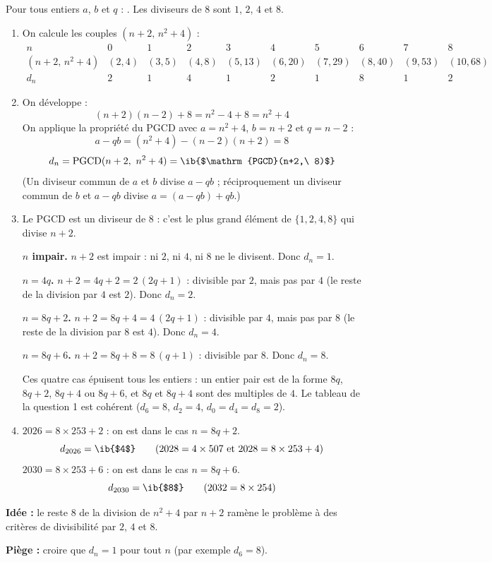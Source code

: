 \begin{prop}[PGCD]
Pour tous entiers $a$, $b$ et $q$ : . Les diviseurs de $8$ sont $1$, $2$, $4$ et $8$.
\end{prop}
\begin{enumerate}
  \item On calcule les couples $(n+2,\,n^2+4)$ :
  \[\begin{array}{c|ccccccccc}
  n&0&1&2&3&4&5&6&7&8\\\hline
  (n+2,\,n^2+4)&(2,4)&(3,5)&(4,8)&(5,13)&(6,20)&(7,29)&(8,40)&(9,53)&(10,68)\\\hline
  d_n&2&1&4&1&2&1&8&1&2
  \end{array}\]

  \item On développe :
  \[(n+2)(n-2)+8=n^2-4+8=n^2+4\]
  On applique la propriété du PGCD avec $a=n^2+4$, $b=n+2$ et $q=n-2$ :
  \[a-qb=(n^2+4)-(n-2)(n+2)=8\]
  \[d_n=\mathrm{PGCD}(n+2,\ n^2+4)=\ib{$\mathrm{PGCD}(n+2,\ 8)$}\]
  (Un diviseur commun de $a$ et $b$ divise $a-qb$ ; réciproquement un diviseur commun de $b$ et $a-qb$ divise $a=(a-qb)+qb$.)

  \item Le PGCD est un diviseur de $8$ : c'est le plus grand élément de $\{1,2,4,8\}$ qui divise $n+2$.

  \textbf{$n$ impair.} $n+2$ est impair : ni $2$, ni $4$, ni $8$ ne le divisent. Donc $d_n=\boxed{1}$.

  \textbf{$n=4q$.} $n+2=4q+2=2\,(2q+1)$ : divisible par $2$, mais pas par $4$ (le reste de la division par $4$ est $2$). Donc $d_n=\boxed{2}$.

  \textbf{$n=8q+2$.} $n+2=8q+4=4\,(2q+1)$ : divisible par $4$, mais pas par $8$ (le reste de la division par $8$ est $4$). Donc $d_n=\boxed{4}$.

  \textbf{$n=8q+6$.} $n+2=8q+8=8\,(q+1)$ : divisible par $8$. Donc $d_n=\boxed{8}$.

  Ces quatre cas épuisent tous les entiers : un entier pair est de la forme $8q$, $8q+2$, $8q+4$ ou $8q+6$, et $8q$ et $8q+4$ sont des multiples de $4$. Le tableau de la question 1 est cohérent ($d_6=8$, $d_2=4$, $d_0=d_4=d_8=2$).

  \item $2026=8\times253+2$ : on est dans le cas $n=8q+2$.
  \[d_{2026}=\ib{$4$}\qquad(2028=4\times507\ \text{et}\ 2028=8\times253+4)\]
  $2030=8\times253+6$ : on est dans le cas $n=8q+6$.
  \[d_{2030}=\ib{$8$}\qquad(2032=8\times254)\]
\end{enumerate}
\textbf{Idée :} le reste $8$ de la division de $n^2+4$ par $n+2$ ramène le problème à des critères de divisibilité par $2$, $4$ et $8$.

\textbf{Piège :} croire que $d_n=1$ pour tout $n$ (par exemple $d_6=8$).
